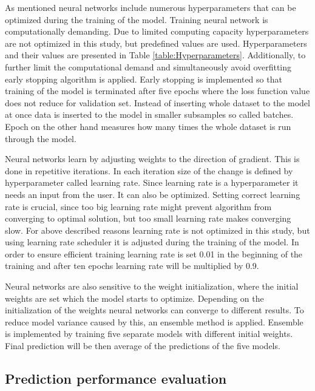 \documentclass{article}
\begin{document}
As mentioned neural networks include numerous hyperparameters that can be optimized during the training of the model. Training neural network is computationally demanding. Due to limited computing capacity hyperparameters are not optimized in this study, but predefined values are used. Hyperparameters and their values are presented in Table \ref{table:Hyperparameters}. Additionally, to further limit the computational demand and simultaneously avoid overfitting early stopping algorithm is applied. Early stopping is implemented so that training of the model is terminated after five epochs where the loss function value does not reduce for validation set. Instead of inserting whole dataset to the model at once data is inserted to the model in smaller subsamples so called batches. Epoch on the other hand measures how many times the whole dataset is run through the model. \par

Neural networks learn by adjusting weights to the direction of gradient. This is done in repetitive iterations. In each iteration size of the change is defined by hyperparameter called learning rate. Since learning rate is a hyperparameter it needs an input from the user. It can also be optimized. Setting correct learning rate is crucial, since too big learning rate might prevent algorithm from converging to optimal solution, but too small learning rate makes converging slow. For above described reasons learning rate is not optimized in this study, but using learning rate scheduler it is adjusted during the training of the model. In order to ensure efficient training learning rate is set 0.01 in the beginning of the training and after ten epochs learning rate will be multiplied by 0.9. \par

Neural networks are also sensitive to the weight initialization, where the initial weights are set which the model starts to optimize. Depending on the initialization of the weights neural networks can converge to different results. To reduce model variance caused by this, an ensemble method is applied. Ensemble is implemented by training five separate models with different initial weights. Final prediction will be then average of the predictions of the five models. \par

\subsection{Prediction performance evaluation}\label{PredictionPerformanceEvaluation}
\end{document}
